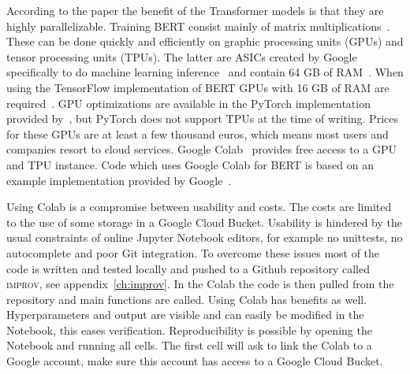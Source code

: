 According to the paper the benefit of the Transformer models is that they are highly parallelizable.
Training BERT consist mainly of matrix multiplications~\citep{dettmers2018}.
These can be done quickly and efficiently on graphic processing units (GPUs) and tensor processing units (TPUs).
The latter are ASICs created by Google specifically to do machine learning inference~\citep{jouppi2017} and contain 64 GB of RAM~\citep{devlin2018github}.
When using the TensorFlow implementation of BERT GPUs with 16 GB of RAM are required~\citep{devlin2018github}.
GPU optimizations are available in the PyTorch implementation provided by~\citet{wolf2018}, but PyTorch does not support TPUs at the time of writing.
Prices for these GPUs are at least a few thousand euros, which means most users and companies resort to cloud services.
Google Colab~\citet{google2019colab} provides free access to a GPU and TPU instance.
Code which uses Google Colab for BERT is based on an example implementation provided by Google~\citep{bajaj2018}.

Using Colab is a compromise between usability and costs.
The costs are limited to the use of some storage in a Google Cloud Bucket.
Usability is hindered by the usual constraints of online Jupyter Notebook editors, for example no unittests, no autocomplete and poor Git integration.
To overcome these issues most of the code is written and tested locally and pushed to a Github repository called \textsc{improv}, see appendix~\ref{ch:improv}.
In the Colab the code is then pulled from the repository and main functions are called.
Using Colab has benefits as well.
Hyperparameters and output are visible and can easily be modified in the Notebook, this eases verification.
Reproducibility is possible by opening the Notebook and running all cells.
The first cell will ask to link the Colab to a Google account, make sure this account has access to a Google Cloud Bucket.


